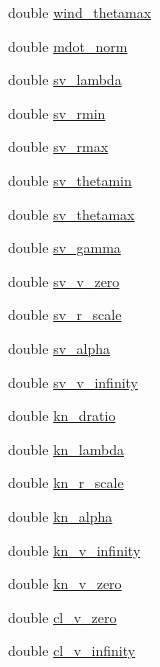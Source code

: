\begin{DoxyCompactItemize}
\item 
double \hyperlink{structdomain_a8b495b7bb1917b887fde8948a209783e}{wind\+\_\+thetamax}
\item 
double \hyperlink{structdomain_a424d4ae859ddf9dc456d1f91e4ffe86d}{mdot\+\_\+norm}
\item 
double \hyperlink{structdomain_a813f3ba19f355859ca42acb3c2292d24}{sv\+\_\+lambda}
\item 
double \hyperlink{structdomain_a4e786a4656d477a90d054c260ab3302d}{sv\+\_\+rmin}
\item 
double \hyperlink{structdomain_af5497596d6f246fae7c5c15458b2a03d}{sv\+\_\+rmax}
\item 
double \hyperlink{structdomain_a2306719a5ca44d8a9583068bc2364779}{sv\+\_\+thetamin}
\item 
double \hyperlink{structdomain_a20e1097ea83aafde4917c3ec41c800b0}{sv\+\_\+thetamax}
\item 
double \hyperlink{structdomain_ab5195a9a179b03ca126f2f0f5beef95a}{sv\+\_\+gamma}
\item 
double \hyperlink{structdomain_ad63ff34e9cf3ccee5dcb2d421f20c451}{sv\+\_\+v\+\_\+zero}
\item 
double \hyperlink{structdomain_a7467c5be7712498d0a673c485074e918}{sv\+\_\+r\+\_\+scale}
\item 
double \hyperlink{structdomain_aba459d2b7c4baf62a69ef13fdb39efde}{sv\+\_\+alpha}
\item 
double \hyperlink{structdomain_aae554cbed4fcece39952775d283b9dac}{sv\+\_\+v\+\_\+infinity}
\item 
double \hyperlink{structdomain_a545d794eb6978b47b263f8cd5ebd851b}{kn\+\_\+dratio}
\item 
double \hyperlink{structdomain_ada92cbd729106e55d48e8a6ae5b8c7c2}{kn\+\_\+lambda}
\item 
double \hyperlink{structdomain_a62fd3473a4d70f61e2db3c7d5e457db0}{kn\+\_\+r\+\_\+scale}
\item 
double \hyperlink{structdomain_a3b98872ee3fe1e81d1ebcc0e58b9493b}{kn\+\_\+alpha}
\item 
double \hyperlink{structdomain_aa7f0bbf95881b4cc4090150669bbf806}{kn\+\_\+v\+\_\+infinity}
\item 
double \hyperlink{structdomain_adb9f726942f3f24572729b1ff144b8c2}{kn\+\_\+v\+\_\+zero}
\item 
double \hyperlink{structdomain_aca5df98ed2e93c7629b0cf879392b6a6}{cl\+\_\+v\+\_\+zero}
\item 
double \hyperlink{structdomain_a0ceccfeb97784817b47ad77d6b926840}{cl\+\_\+v\+\_\+infinity}

\end{DoxyCompactItemize}
